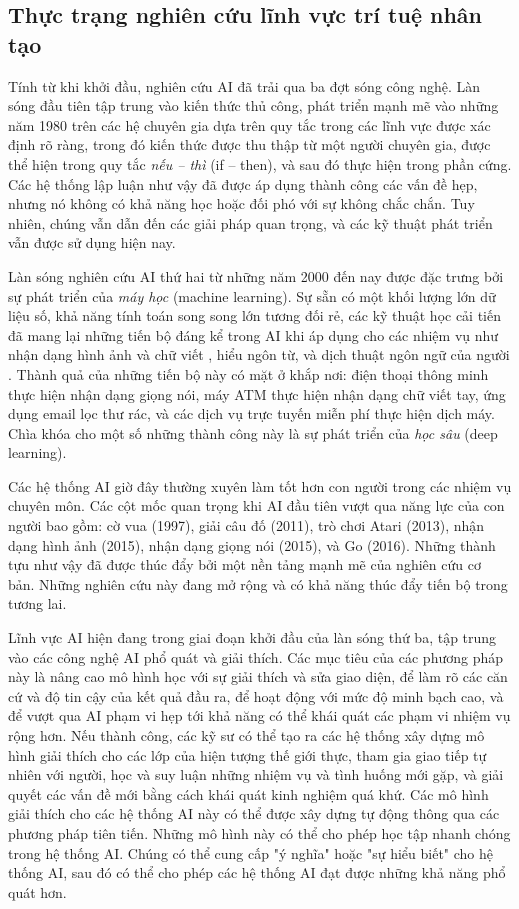 \subsection{Thực trạng nghiên cứu lĩnh vực trí tuệ nhân tạo}
Tính từ khi khởi đầu, nghiên cứu AI đã trải qua ba đợt sóng công nghệ. Làn sóng đầu tiên tập trung vào kiến thức thủ công, phát triển mạnh mẽ vào những năm 1980 trên các hệ chuyên gia dựa trên quy tắc trong các lĩnh vực được xác định rõ ràng, trong đó kiến thức được thu thập từ một người chuyên gia, được thể hiện trong quy tắc \textit{nếu – thì} (if – then), và sau đó thực hiện trong phần cứng. Các hệ thống lập luận như vậy đã được áp dụng thành công các vấn đề hẹp, nhưng nó không có khả năng học hoặc đối phó với sự không chắc chắn. Tuy nhiên, chúng vẫn dẫn đến các giải pháp quan trọng, và các kỹ thuật phát triển vẫn được sử dụng hiện nay.\par
Làn sóng nghiên cứu AI thứ hai từ những năm 2000 đến nay được đặc trưng bởi sự phát triển của \textit{máy học} (machine learning). Sự sẵn có một khối lượng lớn dữ liệu số, khả năng tính toán song song lớn tương đối rẻ, các kỹ thuật học cải tiến đã mang lại những tiến bộ đáng kể trong AI khi áp dụng cho các nhiệm vụ như nhận dạng hình ảnh và chữ viết \parencite{szeto2020deep}, hiểu ngôn từ, và dịch thuật ngôn ngữ của người \parencite{hulth2004combining}. Thành quả của những tiến bộ này có mặt ở khắp nơi: điện thoại thông minh thực hiện nhận dạng giọng nói, máy ATM thực hiện nhận dạng chữ viết tay, ứng dụng email lọc thư rác, và các dịch vụ trực tuyến miễn phí thực hiện dịch máy. Chìa khóa cho một số những thành công này là sự phát triển của \textit{học sâu} (deep learning).\par
Các hệ thống AI giờ đây thường xuyên làm tốt hơn con người trong các nhiệm vụ chuyên môn. Các cột mốc quan trọng khi AI đầu tiên vượt qua năng lực của con người bao gồm: cờ vua (1997), giải câu đố (2011), trò chơi Atari (2013), nhận dạng hình ảnh (2015), nhận dạng giọng nói (2015), và Go (2016). Những thành tựu như vậy đã được thúc đẩy bởi một nền tảng mạnh mẽ của nghiên cứu cơ bản. Những nghiên cứu này đang mở rộng và có khả năng thúc đẩy tiến bộ trong tương lai.\par
Lĩnh vực AI hiện đang trong giai đoạn khởi đầu của làn sóng thứ ba, tập trung vào các công nghệ AI phổ quát và giải thích. Các mục tiêu của các phương pháp này là nâng cao mô hình học với sự giải thích và sửa giao diện, để làm rõ các căn cứ và độ tin cậy của kết quả đầu ra, để hoạt động với mức độ minh bạch cao, và để vượt qua AI phạm vi hẹp tới khả năng có thể khái quát các phạm vi nhiệm vụ rộng hơn. Nếu thành công, các kỹ sư có thể tạo ra các hệ thống xây dựng mô hình giải thích cho các lớp của hiện tượng thế giới thực, tham gia giao tiếp tự nhiên với người, học và suy luận những nhiệm vụ và tình huống mới gặp, và giải quyết các vấn đề mới bằng cách khái quát kinh nghiệm quá khứ. Các mô hình giải thích cho các hệ thống AI này có thể được xây dựng tự động thông qua các phương pháp tiên tiến. Những mô hình này có thể cho phép học tập nhanh chóng trong hệ thống AI. Chúng có thể cung cấp "ý nghĩa" hoặc "sự hiểu biết" cho hệ thống AI, sau đó có thể cho phép các hệ thống AI đạt được những khả năng phổ quát hơn.\par

